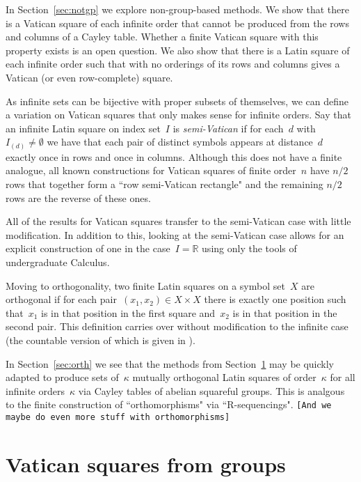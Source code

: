 \documentclass[12pt,a4paper]{article}
\newcommand{\R}{\mathbb{R}}
\begin{document}
In Section~\ref{sec:notgp} we explore non-group-based methods.  We show that there is a Vatican square of each infinite order that cannot be produced from the rows and columns of a Cayley table.  Whether a finite Vatican square with this property exists is an open question.  We also show that there is a Latin square of each infinite order such that with no orderings of its rows and columns gives a Vatican (or even row-complete) square.


As infinite sets can be bijective with proper subsets of themselves, we can define a variation on Vatican squares that only makes sense for infinite orders.
Say that an infinite Latin square on index set~$I$ is {\em semi-Vatican} if for each~$d$ with~$I_{(d)} \neq \emptyset$ we have that each pair of distinct symbols appears at distance~$d$ exactly once in rows and once in columns.  Although this does not have a finite analogue, all known constructions for Vatican squares of finite order~$n$ have $n/2$ rows that together form a ``row semi-Vatican rectangle" and the remaining $n/2$ rows are the reverse of these ones.

All of the results for Vatican squares transfer to the semi-Vatican case with little modification.  In addition to this, looking at the semi-Vatican case allows for an explicit construction of one in the case~$I = \R$ using only the tools of undergraduate Calculus.


Moving to orthogonality, two finite Latin squares on a symbol set~$X$ are orthogonal if for  each pair~$(x_1, x_2) \in X \times X$ there is exactly one position such that~$x_1$ is in that position in the first square and~$x_2$ is in that position in the second pair.  This definition carries over without modification to the infinite case (the countable version of which is given in \cite[p.~116]{DK15}).

In Section~\ref{sec:orth} we see that the methods from Section~\ref{sec:cayley} may be quickly adapted to produce sets of~$\kappa$ mutually orthogonal Latin squares of order~$\kappa$ for all infinite orders~$\kappa$ via Cayley tables of abelian squareful groups.  This is analgous to the finite construction of ``orthomorphisms" via ``R-sequencings".  \texttt{[And we maybe do even more stuff with orthomorphisms]}  


\section{Vatican squares from groups}\label{sec:cayley}
\end{document}
